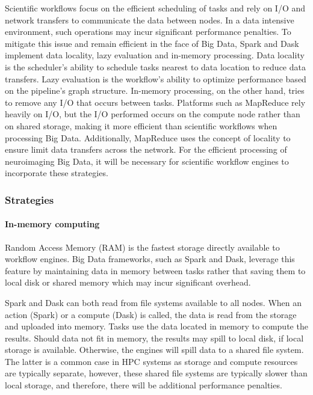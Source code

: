             
            Scientific workflows focus on the efficient scheduling of tasks and
            rely on I/O and network transfers to communicate the data between
            nodes. In a data intensive environment, such operations may incur
            significant performance penalties. To mitigate this issue and remain
            efficient in the face of Big Data, Spark and Dask implement data
            locality, lazy evaluation and in-memory processing. Data locality is
            the scheduler's ability to schedule tasks nearest to data location
            to reduce data transfers. Lazy evaluation is the workflow's ability
            to optimize performance based on the pipeline's graph structure.
            In-memory processing, on the other hand, tries to remove any I/O
            that occurs between tasks. Platforms such as MapReduce rely heavily
            on I/O, but the I/O performed occurs on the compute node rather than
            on shared storage, making it more efficient than
            scientific workflows when processing Big Data. Additionally, MapReduce uses the concept of
            locality to ensure limit data transfers across the network. For the
            efficient processing of neuroimaging Big Data, it will be necessary
            for scientific workflow engines to incorporate these strategies.
        

            \subsubsection{Strategies}
                \paragraph{In-memory computing}
                    Random Access Memory (RAM) is the fastest storage directly available
                    to workflow engines. Big Data frameworks, such as Spark and
                    Dask, leverage this feature by maintaining data in memory
                    between tasks rather that saving them to local disk or
                    shared memory which may incur significant overhead.

                    Spark and Dask can both read from file systems available to
                    all nodes. When an action (Spark) or a compute (Dask) is
                    called, the data is read from the storage and uploaded into
                    memory. Tasks use the data located in memory to compute the
                    results. Should data not fit in memory, the results may
                    spill to local disk, if local storage is available.
                    Otherwise, the engines will spill data to a shared
                    file system. The latter is a common case in HPC systems as
                    storage and compute resources are typically separate,
                    however, these shared file systems are typically slower than
                    local storage, and therefore, there will be additional
                    performance penalties.

